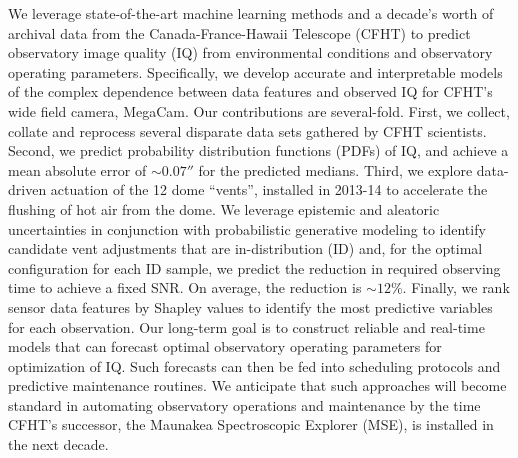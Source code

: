 We leverage state-of-the-art machine learning methods and a decade's worth of archival data from the Canada-France-Hawaii Telescope (CFHT) to predict observatory image quality (IQ) from environmental conditions and observatory operating parameters. Specifically, we develop accurate and interpretable models of the complex dependence between data features and observed IQ for CFHT's wide field camera, MegaCam. Our contributions are several-fold. First, we collect, collate and reprocess several disparate data sets gathered by CFHT scientists. Second, we predict probability distribution functions (PDFs) of IQ, and achieve a mean absolute error of $\sim0.07''$ for the predicted medians. Third, we explore data-driven actuation of the 12 dome ``vents'', installed in 2013-14 to accelerate the flushing of hot air from the dome. We leverage epistemic and aleatoric uncertainties in conjunction with probabilistic generative modeling to identify candidate vent adjustments that are in-distribution (ID) and, for the optimal configuration for each ID sample, we predict the reduction in required observing time to achieve a fixed SNR.  On average, the reduction is $\sim12\%$. Finally, we rank sensor data features by Shapley values to identify the most predictive variables for each observation. Our long-term goal is to construct reliable and real-time models that can forecast optimal observatory operating parameters for optimization of IQ. Such forecasts can then be fed into scheduling protocols and predictive maintenance routines. We anticipate that such approaches will become standard in automating observatory operations and maintenance by the time CFHT's successor, the Maunakea Spectroscopic Explorer (MSE), is installed in the next decade.
\fi
